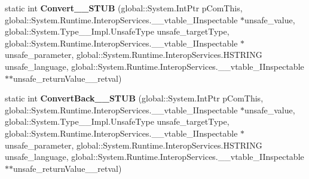 \begin{DoxyCompactItemize}
\item 
\mbox{\label{struct_windows_1_1_u_i_1_1_xaml_1_1_data_1_1_i_value_converter_____impl_1_1_vtbl_aad498aa18051b0397a2382c868b62168}} 
static int {\bfseries Convert\+\_\+\+\_\+\+S\+T\+UB} (global\+::\+System.\+Int\+Ptr p\+Com\+This, global\+::\+System.\+Runtime.\+Interop\+Services.\+\_\+\+\_\+vtable\+\_\+\+I\+Inspectable $\ast$unsafe\+\_\+value, global\+::\+System.\+Type\+\_\+\+\_\+\+Impl.\+Unsafe\+Type unsafe\+\_\+target\+Type, global\+::\+System.\+Runtime.\+Interop\+Services.\+\_\+\+\_\+vtable\+\_\+\+I\+Inspectable $\ast$unsafe\+\_\+parameter, global\+::\+System.\+Runtime.\+Interop\+Services.\+H\+S\+T\+R\+I\+NG unsafe\+\_\+language, global\+::\+System.\+Runtime.\+Interop\+Services.\+\_\+\+\_\+vtable\+\_\+\+I\+Inspectable $\ast$$\ast$unsafe\+\_\+return\+Value\+\_\+\+\_\+retval)
\item 
\mbox{\label{struct_windows_1_1_u_i_1_1_xaml_1_1_data_1_1_i_value_converter_____impl_1_1_vtbl_ad8c751d6dd6e13f3655511062d880c14}} 
static int {\bfseries Convert\+Back\+\_\+\+\_\+\+S\+T\+UB} (global\+::\+System.\+Int\+Ptr p\+Com\+This, global\+::\+System.\+Runtime.\+Interop\+Services.\+\_\+\+\_\+vtable\+\_\+\+I\+Inspectable $\ast$unsafe\+\_\+value, global\+::\+System.\+Type\+\_\+\+\_\+\+Impl.\+Unsafe\+Type unsafe\+\_\+target\+Type, global\+::\+System.\+Runtime.\+Interop\+Services.\+\_\+\+\_\+vtable\+\_\+\+I\+Inspectable $\ast$unsafe\+\_\+parameter, global\+::\+System.\+Runtime.\+Interop\+Services.\+H\+S\+T\+R\+I\+NG unsafe\+\_\+language, global\+::\+System.\+Runtime.\+Interop\+Services.\+\_\+\+\_\+vtable\+\_\+\+I\+Inspectable $\ast$$\ast$unsafe\+\_\+return\+Value\+\_\+\+\_\+retval)
\end{DoxyCompactItemize}
